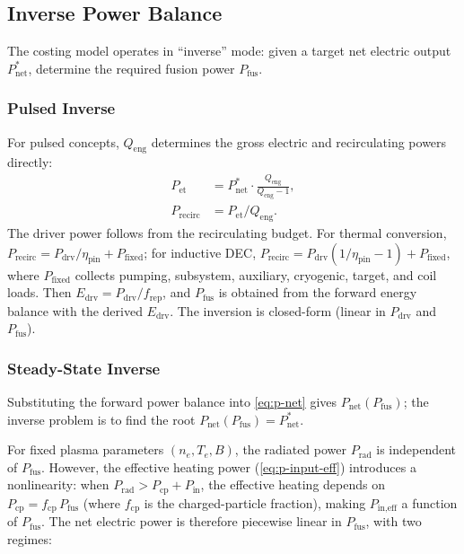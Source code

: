 \documentclass{article}
\begin{document}
\subsection{Inverse Power Balance}
\label{sec:inverse-balance}

The costing model operates in ``inverse'' mode: given a target net
electric output $P_{\text{net}}^*$, determine the required fusion power
$P_{\text{fus}}$.

\subsubsection{Pulsed Inverse}
For pulsed concepts, $Q_{\text{eng}}$ determines the gross electric and
recirculating powers directly:
\begin{align}
P_{\text{et}} &= P_{\text{net}}^* \cdot \frac{Q_{\text{eng}}}{Q_{\text{eng}} - 1}, \\
P_{\text{recirc}} &= P_{\text{et}} / Q_{\text{eng}}.
\end{align}
The driver power follows from the recirculating budget.  For thermal
conversion, $P_{\text{recirc}} = P_{\text{drv}}/\eta_{\text{pin}}
+ P_{\text{fixed}}$; for inductive DEC,
$P_{\text{recirc}} = P_{\text{drv}}(1/\eta_{\text{pin}} - 1)
+ P_{\text{fixed}}$, where $P_{\text{fixed}}$ collects
pumping, subsystem, auxiliary, cryogenic, target, and coil loads.
Then $E_{\text{drv}} = P_{\text{drv}} / f_{\text{rep}}$, and
$P_{\text{fus}}$ is obtained from the forward energy balance
with the derived $E_{\text{drv}}$.  The inversion is closed-form
(linear in $P_{\text{drv}}$ and $P_{\text{fus}}$).

\subsubsection{Steady-State Inverse}  Substituting the forward power balance into
\cref{eq:p-net} gives $P_{\text{net}}(P_{\text{fus}})$; the inverse
problem is to find the root
$P_{\text{net}}(P_{\text{fus}}) = P_{\text{net}}^*$.

For fixed plasma parameters $(n_e, T_e, B)$, the radiated power
$P_{\text{rad}}$ is independent of $P_{\text{fus}}$.  However, the
effective heating power (\cref{eq:p-input-eff}) introduces a
nonlinearity: when $P_{\text{rad}} > P_{\text{cp}} + P_{\text{in}}$,
the effective heating depends on $P_{\text{cp}} = f_{\text{cp}} \,
P_{\text{fus}}$ (where $f_{\text{cp}}$ is the charged-particle
fraction), making $P_{\text{in,eff}}$ a function of $P_{\text{fus}}$.
The net electric power is therefore piecewise linear in
$P_{\text{fus}}$, with two regimes:
\end{document}
